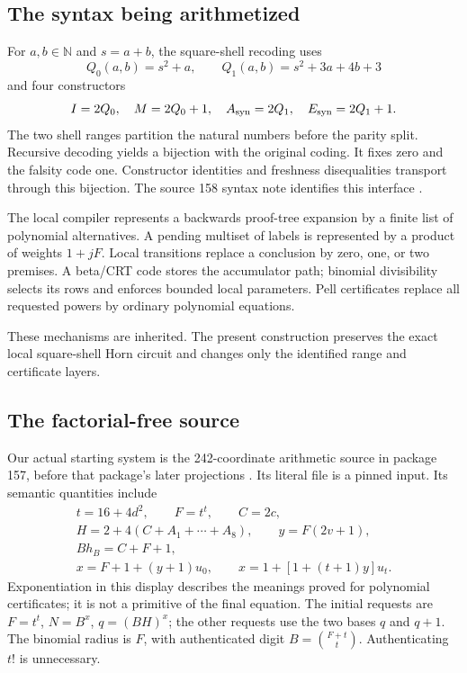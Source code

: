 \documentclass[11pt,letterpaper]{article}
\theoremstyle{remark}
\newcommand{\N}{\mathbb N}
\begin{document}
\subsection{The syntax being arithmetized}

For \(a,b\in\N\) and \(s=a+b\), the square-shell recoding uses
\[
 Q_0(a,b)=s^2+a,\qquad Q_1(a,b)=s^2+3a+4b+3
\]
and four constructors
\[
 I=2Q_0,\quad M=2Q_0+1,\quad A_{\rm syn}=2Q_1,\quad E_{\rm syn}=2Q_1+1.
\]
The two shell ranges partition the natural numbers before the parity
split. Recursive decoding yields a bijection with the original coding.
It fixes zero and the falsity code one. Constructor identities and
freshness disequalities transport through this bijection. The source
158 syntax note identifies this interface \cite{s158}.

The local compiler represents a backwards proof-tree expansion by a
finite list of polynomial alternatives. A pending multiset of labels
is represented by a product of weights \(1+jF\). Local transitions
replace a conclusion by zero, one, or two premises. A beta/CRT code
stores the accumulator path; binomial divisibility selects its rows
and enforces bounded local parameters. Pell certificates replace all
requested powers by ordinary polynomial equations.

These mechanisms are inherited. The present construction preserves the
exact local square-shell Horn circuit and changes only the identified
range and certificate layers.

\subsection{The factorial-free source}

Our actual starting system is the 242-coordinate arithmetic source in
package 157, before that package's later projections \cite{s157}.
Its literal file is a pinned input. Its semantic quantities include
\begin{equation}\label{eq:source}
\begin{gathered}
 t=16+4d^2,\qquad F=t^t,\qquad C=2c,\\
 H=2+4(C+A_1+\cdots+A_8),\qquad y=F(2v+1),\\
 B h_B=C+F+1,\\
 x=F+1+(y+1)u_0,\qquad
 x=1+[1+(t+1)y]u_t.
\end{gathered}
\end{equation}
Exponentiation in this display describes the meanings proved for
polynomial certificates; it is not a primitive of the final equation.
The initial requests are \(F=t^t\), \(N=B^x\), \(q=(BH)^x\);
the other requests use the two bases \(q\) and \(q+1\).
The binomial radius is \(F\), with authenticated digit
\(B=\binom{F+t}{t}\). Authenticating \(t!\) is unnecessary.
\end{document}
